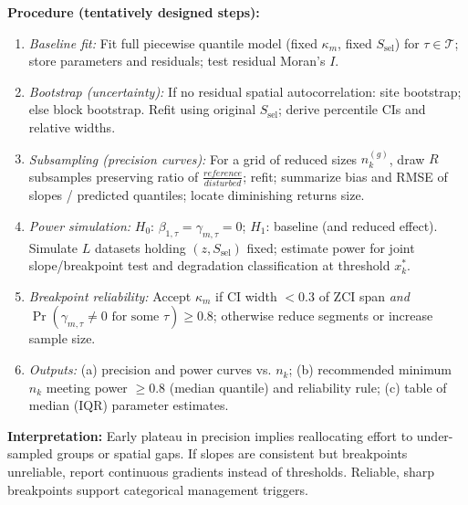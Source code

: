 	\textbf{Procedure (tentatively designed steps):}
\begin{enumerate}
    \item \emph{Baseline fit:} Fit full piecewise quantile model (fixed $\kappa_m$, fixed $S_{\text{sel}}$) for $\tau \in \mathcal{T}$; store parameters and residuals; test residual Moran's $I$.
    \item \emph{Bootstrap (uncertainty):} If no residual spatial autocorrelation: site bootstrap; else block bootstrap. Refit using original $S_{\text{sel}}$; derive percentile CIs and relative widths.
    \item \emph{Subsampling (precision curves):} For a grid of reduced sizes $n_k^{(g)}$, draw $R$ subsamples preserving 
    ratio of \(\frac{reference}{disturbed}\); refit; summarize bias and RMSE of slopes / predicted quantiles; locate diminishing returns size.
    \item \emph{Power simulation:} \(H_0\): $\beta_{1,\tau}=\gamma_{m,\tau}=0$; \(H_1\): baseline (and reduced effect). Simulate $L$ datasets holding $(z, S_{\text{sel}})$ fixed; estimate power for joint slope/breakpoint test and degradation classification at threshold $x_k^*$.
    \item \emph{Breakpoint reliability:} Accept $\kappa_m$ if CI width $< 0.3$ of ZCI span \emph{and} $\Pr(\gamma_{m,\tau}\neq 0 \text{ for some } \tau) \ge 0.8$; otherwise reduce segments or increase sample size.
    \item \emph{Outputs:} (a) precision and power curves vs. $n_k$; (b) recommended minimum $n_k$ meeting power $\ge 0.8$ (median quantile) and reliability rule; (c) table of median (IQR) parameter estimates.
\end{enumerate}

	\textbf{Interpretation:} Early plateau in precision implies reallocating effort to under-sampled groups or spatial gaps.
     If slopes are consistent but breakpoints unreliable, report continuous gradients instead of thresholds.
    Reliable, sharp breakpoints support categorical management triggers.


